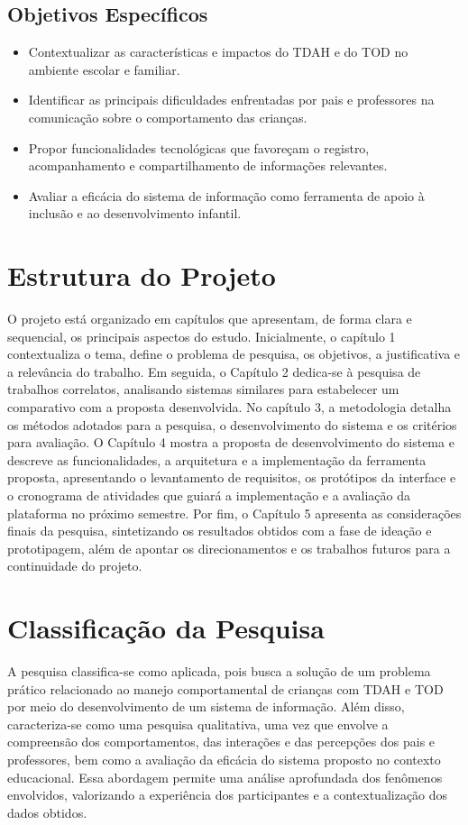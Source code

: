 \subsection{Objetivos Específicos}

\begin{itemize}
    \item Contextualizar as características e impactos do TDAH e do TOD no ambiente escolar e familiar.
    \item Identificar as principais dificuldades enfrentadas por pais e professores na comunicação sobre o comportamento das crianças.
    \item Propor funcionalidades tecnológicas que favoreçam o registro, acompanhamento e compartilhamento de informações relevantes.
    \item Avaliar a eficácia do sistema de informação como ferramenta de apoio à inclusão e ao desenvolvimento infantil.
\end{itemize}

\vspace{0.3cm}
\section{Estrutura do Projeto}


O projeto está organizado em capítulos que apresentam, de forma clara e sequencial, os principais aspectos do estudo. Inicialmente, o capítulo 1 contextualiza o tema, define o problema de pesquisa, os objetivos, a justificativa e a relevância do trabalho. Em seguida, o Capítulo 2 dedica-se à pesquisa de trabalhos correlatos, analisando sistemas similares para estabelecer um comparativo com a proposta desenvolvida. No capítulo 3, a  metodologia detalha os métodos adotados para a pesquisa, o desenvolvimento do sistema e os critérios para avaliação. O Capítulo 4 mostra a proposta de desenvolvimento do sistema e descreve as funcionalidades, a arquitetura e a implementação da ferramenta proposta, apresentando o levantamento de requisitos, os protótipos da interface e o cronograma de atividades que guiará a implementação e a avaliação da plataforma no próximo semestre. Por fim, o Capítulo 5 apresenta as considerações finais da pesquisa, sintetizando os resultados obtidos com a fase de ideação e prototipagem, além de apontar os direcionamentos e os trabalhos futuros para a continuidade do projeto.

\vspace{0.3cm}
\section{Classificação da Pesquisa}

A pesquisa classifica-se como aplicada, pois busca a solução de um problema prático relacionado ao manejo comportamental de crianças com TDAH e TOD por meio do desenvolvimento de um sistema de informação. Além disso, caracteriza-se como uma pesquisa qualitativa, uma vez que envolve a compreensão dos comportamentos, das interações e das percepções dos pais e professores, bem como a avaliação da eficácia do sistema proposto no contexto educacional. Essa abordagem permite uma análise aprofundada dos fenômenos envolvidos, valorizando a experiência dos participantes e a contextualização dos dados obtidos.

